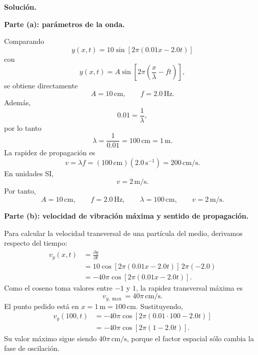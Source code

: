 \documentclass[11pt]{article}
\newcommand{\soluciontitulo}{%
  \par\medskip
  \noindent\textbf{Solución.}\par
  \smallskip
}
\newcommand{\paso}[1]{%
  \par\medskip
  \noindent\textbf{#1}\par
  \vspace{0.1em}%
}
\begin{document}
\soluciontitulo

\paso{Parte (a): par\'ametros de la onda.}
Comparando
\begin{equation*}
    y(x,t)=10\sin\left[2\pi(0.01x-2.0t)\right]
\end{equation*}
con
\begin{equation*}
    y(x,t)=A\sin\left[2\pi\left(\frac{x}{\lambda}-ft\right)\right],
\end{equation*}
se obtiene directamente
\begin{equation*}
    A=10\,\mathrm{cm},
    \qquad
    f=2.0\,\mathrm{Hz}.
\end{equation*}
Adem\'as,
\begin{equation*}
    0.01=\frac{1}{\lambda},
\end{equation*}
por lo tanto
\begin{equation*}
    \lambda=\frac{1}{0.01}=100\,\mathrm{cm}=1\,\mathrm{m}.
\end{equation*}
La rapidez de propagaci\'on es
\begin{equation*}
    v=\lambda f=(100\,\mathrm{cm})(2.0\,\mathrm{s}^{-1})=200\,\mathrm{cm/s}.
\end{equation*}
En unidades SI,
\begin{equation*}
    v=2\,\mathrm{m/s}.
\end{equation*}
Por tanto,
\begin{equation*}
    \boxed{A=10\,\mathrm{cm}},\qquad
    \boxed{f=2.0\,\mathrm{Hz}},\qquad
    \boxed{\lambda=100\,\mathrm{cm}},\qquad
    \boxed{v=2\,\mathrm{m/s}}.
\end{equation*}

\paso{Parte (b): velocidad de vibraci\'on m\'axima y sentido de propagaci\'on.}
Para calcular la velocidad transversal de una part\'icula del medio, derivamos respecto del tiempo:
\begin{align*}
    v_y(x,t)
    &=\frac{\partial y}{\partial t}\\
    &=10\cos\left[2\pi(0.01x-2.0t)\right]\,2\pi(-2.0)\\
    &=-40\pi\cos\left[2\pi(0.01x-2.0t)\right].
\end{align*}
Como el coseno toma valores entre $-1$ y $1$, la rapidez transversal m\'axima es
\begin{equation*}
    v_{y,\max}=40\pi\,\mathrm{cm/s}.
\end{equation*}
El punto pedido est\'a en $x=1\,\mathrm{m}=100\,\mathrm{cm}$. Sustituyendo,
\begin{align*}
    v_y(100,t)
    &=-40\pi\cos\left[2\pi(0.01\cdot100-2.0t)\right]\\
    &=-40\pi\cos\left[2\pi(1-2.0t)\right].
\end{align*}
Su valor m\'aximo sigue siendo $40\pi\,\mathrm{cm/s}$, porque el factor espacial s\'olo cambia la fase de oscilaci\'on.
\end{document}
